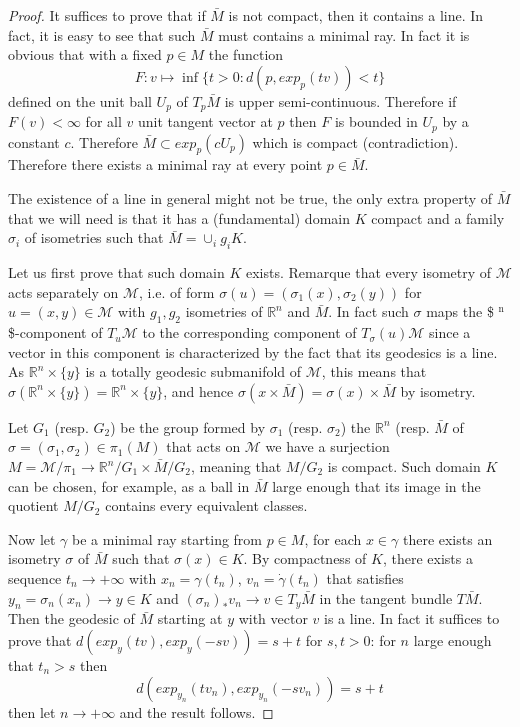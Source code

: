 \documentclass[11pt]{article}
\begin{document}
\begin{proof}
It suffices to prove that if \(\bar M\) is not compact, then it contains a line. In fact, it is easy
to see that such \(\bar M\) must contains a minimal ray. In fact it is obvious that with a fixed \(p\in
M\) the function
\[
F: v\mapsto \inf \{t>0: d(p,exp_p(tv)) < t\}
\]
defined on the unit ball \(U_p\) of \(T_p\bar M\) is upper semi-continuous. Therefore if \(F(v)<\infty\)
for all \(v\) unit tangent vector at \(p\) then \(F\) is bounded in \(U_p\) by a constant \(c\). Therefore
\(\bar M\subset exp_p(cU_p)\) which is compact (contradiction). Therefore there exists a minimal ray
at every point \(p\in \bar M\).

The existence of a line in general might not be true, the only extra property of \(\bar M\) that we
will need is that it has a (fundamental) domain \(K\) compact and a family \(\sigma_i\) of isometries
such that \(\bar M = \cup_i g_i K\).

Let us first prove that such domain \(K\) exists. Remarque that every isometry of \(\mathcal{M}\) acts
separately on \(\mathcal{M}\), i.e. of form \(\sigma(u) = (\sigma_1(x), \sigma_2(y))\) for \(u=(x,y)\in
\mathcal{M}\) with \(g_1, g_2\) isometries of \(\mathbb{R}^n\) and \(\bar M\). In fact such \(\sigma\) maps
the \$ \(^{\text{n}}\)\$-component of \(T_u\mathcal{M}\) to the corresponding component of \(T_\sigma(u)
\mathcal{M}\) since a vector in this component is characterized by the fact that its geodesics is a
line. As \(\mathbb{R}^n \times \{y\}\) is a totally geodesic submanifold of \(\mathcal{M}\), this
means that \(\sigma(\mathbb{R}^n \times \{ y\}) = \mathbb{R}^n \times \{y\}\), and hence
\(\sigma(x\times \bar M) = \sigma(x)\times \bar M\) by isometry.

Let \(G_1\) (resp. \(G_2\)) be the group formed by \(\sigma_1\) (resp. \(\sigma_2\)) the \(\mathbb{R}^n\)
(resp. \(\bar M\) of \(\sigma = (\sigma_1,\sigma_2)\in \pi_1(M)\) that acts on \(\mathcal{M}\) we have a
surjection \(M = \mathcal{M}/\pi_1 \longrightarrow \mathbb{R}^n/G_1\times \bar M/G_2\), meaning that
\(M/G_2\) is compact. Such domain \(K\) can be chosen, for example, as a ball in \(\bar M\) large enough that its
image in the quotient \(M/G_2\) contains every equivalent classes.

Now let \(\gamma\) be a minimal ray starting from \(p\in M\), for each \(x\in \gamma\) there exists an
isometry \(\sigma\) of \(\bar M\) such that \(\sigma(x)\in K\). By compactness of \(K\), there exists a
sequence \(t_n \to +\infty\) with \(x_n =\gamma(t_n)\), \(v_n = \dot\gamma(t_n)\) that satisfies \(y_n =
\sigma_n(x_n) \to y\in K\) and \((\sigma_n)_* v_n \to v\in T_y\bar M\) in the tangent bundle \(T\bar
M\). Then the geodesic of \(\bar M\) starting at \(y\) with vector \(v\) is a
line. In fact it suffices to prove that \(d(exp_y(t v), exp_y(-s v)) = s+t\) for \(s,t>0\): for \(n\)
large enough that \(t_n > s\) then
\[
d(exp_{y_n}(tv_n), exp_{y_n}(-sv_n)) = s+t
\]
then let \(n\to +\infty\) and the result follows.
\end{proof}
\end{document}
